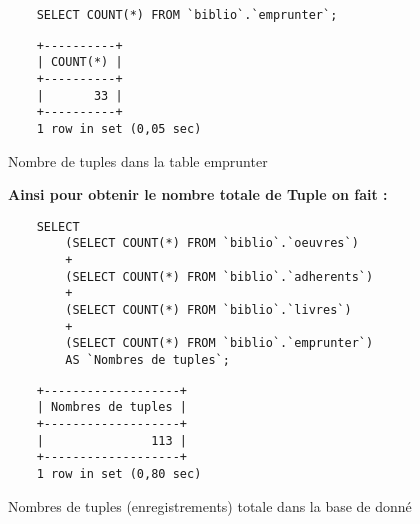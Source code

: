 \documentclass{article}
\begin{document}
\begin{listing}[H]
	\begin{verbatim}
	SELECT COUNT(*) FROM `biblio`.`emprunter`;
	\end{verbatim}
	\begin{verbatim}
	+----------+
	| COUNT(*) |
	+----------+
	|       33 |
	+----------+
	1 row in set (0,05 sec)	
	\end{verbatim}
	\caption{Nombre de tuples dans la table emprunter}
\end{listing}
\textbf{Ainsi pour obtenir le nombre totale de Tuple on fait :}
\begin{listing}[H]
	\begin{verbatim}
	SELECT 
		(SELECT COUNT(*) FROM `biblio`.`oeuvres`) 
		+
		(SELECT COUNT(*) FROM `biblio`.`adherents`)
		+
		(SELECT COUNT(*) FROM `biblio`.`livres`)
		+
		(SELECT COUNT(*) FROM `biblio`.`emprunter`)
		AS `Nombres de tuples`;
	\end{verbatim}
	\begin{verbatim}
	+-------------------+
	| Nombres de tuples |
	+-------------------+
	|               113 |
	+-------------------+
	1 row in set (0,80 sec)
	\end{verbatim}
	\caption{Nombres de tuples (enregistrements) totale dans la base de donné}
\end{listing}
\end{document}

